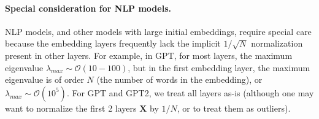 \paragraph{Special consideration for NLP models.}

NLP models, and other models with large initial embeddings, require special care because the embedding layers frequently lack the implicit $1/\sqrt{N}$ normalization present in other layers.
For example, in GPT, for most layers, the maximum eigenvalue $\lambda_{max}\sim\mathcal{O}(10-100)$, but in the first embedding layer, the maximum eigenvalue is of order $N$ (the number of words in the embedding), or $\lambda_{max}\sim\mathcal{O}(10^{5})$.  
For GPT and GPT2, we treat all layers as-is (although one may want to normalize the first 2 layers $\mathbf{X}$ by $1/N$, or to treat them as outliers).


